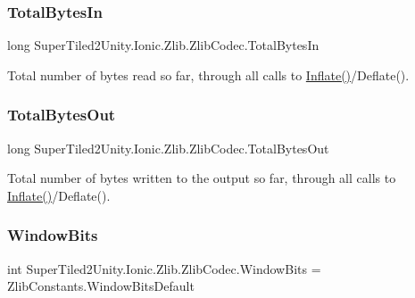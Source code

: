 \subsubsection{\texorpdfstring{Total\+Bytes\+In}{TotalBytesIn}}
{\footnotesize\ttfamily long Super\+Tiled2\+Unity.\+Ionic.\+Zlib.\+Zlib\+Codec.\+Total\+Bytes\+In}



Total number of bytes read so far, through all calls to \mbox{\hyperlink{class_super_tiled2_unity_1_1_ionic_1_1_zlib_1_1_zlib_codec_a9586e5a25c06331824638439938ac8c8}{Inflate()}}/\+Deflate(). 

\mbox{\label{class_super_tiled2_unity_1_1_ionic_1_1_zlib_1_1_zlib_codec_a8f8527e39db5c3b855dd79f2b02de8d0}} 
\subsubsection{\texorpdfstring{Total\+Bytes\+Out}{TotalBytesOut}}
{\footnotesize\ttfamily long Super\+Tiled2\+Unity.\+Ionic.\+Zlib.\+Zlib\+Codec.\+Total\+Bytes\+Out}



Total number of bytes written to the output so far, through all calls to \mbox{\hyperlink{class_super_tiled2_unity_1_1_ionic_1_1_zlib_1_1_zlib_codec_a9586e5a25c06331824638439938ac8c8}{Inflate()}}/\+Deflate(). 

\mbox{\label{class_super_tiled2_unity_1_1_ionic_1_1_zlib_1_1_zlib_codec_a054b7ff1da2e1bac82b771808706398c}} 
\subsubsection{\texorpdfstring{Window\+Bits}{WindowBits}}
{\footnotesize\ttfamily int Super\+Tiled2\+Unity.\+Ionic.\+Zlib.\+Zlib\+Codec.\+Window\+Bits = Zlib\+Constants.\+Window\+Bits\+Default}



